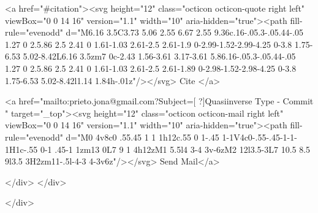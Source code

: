      <a  href="#citation"><svg height="12" class="octicon octicon-quote right left" viewBox="0 0 14 16" version="1.1" width="10" aria-hidden="true"><path fill-rule="evenodd" d="M6.16 3.5C3.73 5.06 2.55 6.67 2.55 9.36c.16-.05.3-.05.44-.05 1.27 0 2.5.86 2.5 2.41 0 1.61-1.03 2.61-2.5 2.61-1.9 0-2.99-1.52-2.99-4.25 0-3.8 1.75-6.53 5.02-8.42L6.16 3.5zm7 0c-2.43 1.56-3.61 3.17-3.61 5.86.16-.05.3-.05.44-.05 1.27 0 2.5.86 2.5 2.41 0 1.61-1.03 2.61-2.5 2.61-1.89 0-2.98-1.52-2.98-4.25 0-3.8 1.75-6.53 5.02-8.42l1.14 1.84h-.01z"/></svg> Cite
      </a>

      <a href="mailto:prieto.jona@gmail.com?Subject=[ ?]Quasiinverse Type - Commit " target="_top"><svg height="12" class="octicon octicon-mail right left" viewBox="0 0 14 16" version="1.1" width="10" aria-hidden="true"><path fill-rule="evenodd" d="M0 4v8c0 .55.45 1 1 1h12c.55 0 1-.45 1-1V4c0-.55-.45-1-1-1H1c-.55 0-1 .45-1 1zm13 0L7 9 1 4h12zM1 5.5l4 3-4 3v-6zM2 12l3.5-3L7 10.5 8.5 9l3.5 3H2zm11-.5l-4-3 4-3v6z"/></svg> Send Mail</a>

    </div>
  </div>

</div>




